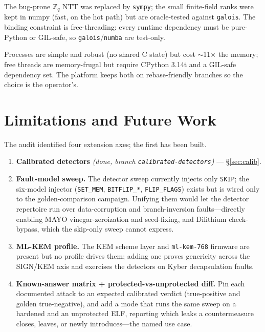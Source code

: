 \documentclass[11pt]{article}
\newcommand{\code}[1]{\texttt{#1}}
\newcommand{\Zq}{\ensuremath{\mathbb{Z}_q}}
\begin{document}
\begin{description}[leftmargin=0em,style=nextline]
\item[Hand-rolled vs.\ library math.] The bug-prone \Zq{} NTT was replaced by
\code{sympy}; the small finite-field ranks were kept in numpy (fast, on the hot path)
but are oracle-tested against \code{galois}. The binding constraint is
free-threading: every runtime dependency must be pure-Python or GIL-safe, so
\code{galois}/\code{numba} are test-only.

\item[Processes vs.\ free threads.] Processes are simple and robust (no shared C
state) but cost $\sim$11$\times$ the memory; free threads are memory-frugal but
require CPython 3.14t and a GIL-safe dependency set. The platform keeps both on
rebase-friendly branches so the choice is the operator's.
\end{description}

\section{Limitations and Future Work}\label{sec:future}

The audit identified four extension axes; the first has been built.

\begin{enumerate}[leftmargin=1.5em]
  \item \textbf{Calibrated detectors} \emph{(done, branch \code{calibrated-detectors})}
  --- \S\ref{sec:calib}.
  \item \textbf{Fault-model sweep.} The detector sweep currently injects only
  \code{SKIP}; the six-model injector (\code{SET\_MEM}, \code{BITFLIP\_*},
  \code{FLIP\_FLAGS}) exists but is wired only to the golden-comparison campaign.
  Unifying them would let the detector repertoire run over data-corruption and
  branch-inversion faults---directly enabling MAYO vinegar-zeroization and
  seed-fixing, and Dilithium check-bypass, which the skip-only sweep cannot express.
  \item \textbf{ML-KEM profile.} The KEM scheme layer and \code{ml-kem-768} firmware
  are present but no profile drives them; adding one proves genericity across the
  SIGN/KEM axis and exercises the detectors on Kyber decapsulation faults.
  \item \textbf{Known-answer matrix + protected-vs-unprotected diff.} Pin each
  documented attack to an expected calibrated verdict (true-positive and golden
  true-negative), and add a mode that runs the same sweep on a hardened and an
  unprotected ELF, reporting which leaks a countermeasure closes, leaves, or newly
  introduces---the named use case.
\end{enumerate}
\end{document}
